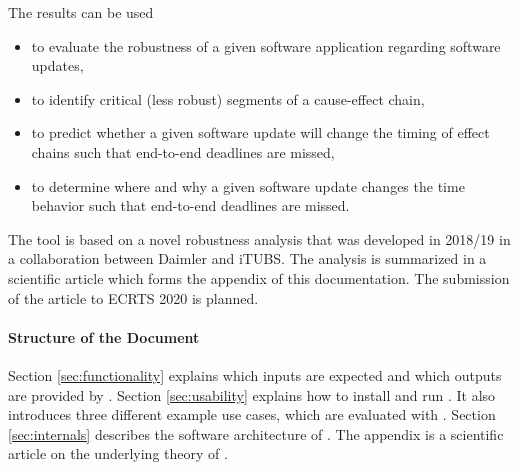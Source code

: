 \noindent
The results can be used
\begin{itemize}
	\item to evaluate the robustness of a given software application regarding software updates, 
	\item to identify critical (less robust) segments of a cause-effect chain,
	\item to predict whether a given software update will change the timing of effect chains such that end-to-end deadlines are missed,
	\item to determine where and why a given software update changes the time behavior such that end-to-end deadlines are missed.
\end{itemize}
\bigskip

\noindent
The tool \Tool is based on a novel robustness analysis that was developed in 2018/19 in a collaboration between Daimler and iTUBS.
The analysis is summarized in a scientific article which forms the appendix of this documentation.
The submission of the article to ECRTS 2020 is planned.


\paragraph{Structure of the Document}
Section \ref{sec:functionality} explains which inputs are expected and which outputs are provided by \Tool. 
Section \ref{sec:usability} explains how to install and run \Tool. It also introduces three different example use cases, which are evaluated with \Tool. 
Section \ref{sec:internals} describes the software architecture of \Tool.  
The appendix is a scientific article on the underlying theory of \Tool.



